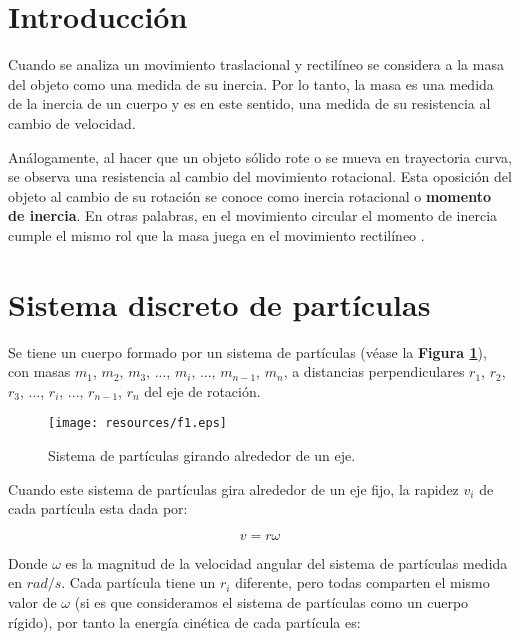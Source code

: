 \documentclass[letter,twoside,11pt]{article}
\begin{document}
\clearpage
\setcounter{page}{1}

\tableofcontents
\newpage

\section{Introducción}
Cuando se analiza un movimiento traslacional y rectilíneo se considera a la masa
del objeto como una medida de su inercia. Por lo tanto, la masa es una medida de
la inercia de un cuerpo y es en este sentido, una medida de su resistencia al
cambio de velocidad.

Análogamente, al hacer que un objeto sólido rote o se mueva en trayectoria
curva, se observa una resistencia al cambio del movimiento rotacional. Esta
oposición del objeto al cambio de su rotación se conoce como inercia rotacional
o \textbf{momento de inercia}. En otras palabras, en el movimiento circular el
momento de inercia cumple el mismo rol que la masa juega en el movimiento
rectilíneo \cite{FISIC.CH}.

\section{Sistema discreto de partículas \cite{Sears}}
Se tiene un cuerpo formado por un sistema de partículas (véase la \textbf{Figura
\ref{figura1}}), con masas $m_1$, $m_2$, $m_3$, ..., $m_i$, ..., $m_{n-1}$,
$m_n$, a distancias perpendiculares $r_1$, $r_2$, $r_3$, ..., $r_i$, ...,
$r_{n-1}$, $r_n$ del eje de rotación.

\begin{figure}
\centering
\texttt{[image: resources/f1.eps]}
\caption{Sistema de partículas girando alrededor de un eje.}
\label{figura1}
\end{figure}

Cuando este sistema de partículas gira alrededor de un eje fijo, la rapidez
$v_i$ de cada partícula esta dada por:

\begin{equation*}
    v = r \omega
\label{velocidad}
\end{equation*}

Donde $\omega$ es la magnitud de la velocidad angular del sistema de partículas
medida en $rad/s$. Cada partícula tiene un $r_i$ diferente, pero todas comparten
el mismo valor de $\omega$ (si es que consideramos el sistema de partículas como
un cuerpo rígido), por tanto la energía cinética de cada partícula es:
\end{document}
